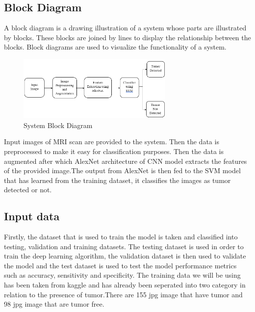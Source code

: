   \subsection{Block Diagram}
  \vspace{-18pt}
A block diagram is a drawing illustration of a system whose parts are illustrated by blocks. These blocks are joined by lines to display the relationship between the blocks. Block diagrams are used to visualize the functionality of a system.
\begin{figure}[tbh] %
\begin{center}
	\includegraphics[width=3in]{images/systemBlock.png} 
	\caption{ System Block Diagram} %
	\label{System Block Diagram} %
	
\end{center}
\end{figure}
\par
Input images of MRI scan are provided to the system. Then the data is preprocessed to make it easy for classification purposes. Then the data is augmented after which AlexNet architecture of CNN model extracts the features of the provided image.The output from AlexNet is then fed to the SVM model that has learned from the training dataset, it classifies the images as tumor detected or not.
\subsection{Input data}
\vspace{-18pt}
Firstly, the dataset that is used to train the model is taken and classified into testing, validation and training datasets. The testing dataset is used in order to train the deep learning algorithm, the validation dataset is then used to validate the model and the test dataset is used to test the model performance metrics such as accuracy, sensitivity and specificity. The training data we will be using has been taken from kaggle and has already been seperated into two category in relation to the presence of tumor.There are 155 jpg image that have tumor and 98 jpg image that are tumor free.
